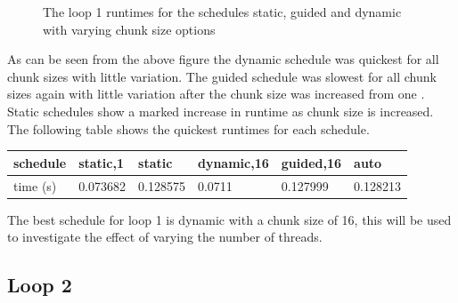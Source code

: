 \documentclass[12pt]{article} %
\begin{document}
\begin{figure}[H] %
\caption{The loop 1 runtimes for the schedules static, guided and dynamic with varying chunk size options}
\label{fig:speciation}
\end{figure}

As can be seen from the above figure the dynamic schedule was quickest for all chunk sizes with little variation. The guided schedule was slowest for all chunk sizes again with little variation after the chunk size was increased from one . Static schedules show a marked increase in runtime as chunk size is increased. The following table shows the quickest runtimes for each schedule. 

\begin{center}
    \begin{tabular}{| l | l | l | l | l | l |}
    \hline
    schedule &static,1 & static &dynamic,16 & guided,16 & auto \\ \hline
    time (s) &0.073682&0.128575 & 0.0711& 0.127999& 0.128213\\ \hline
    \end{tabular}
\end{center} 

The best schedule for loop 1 is dynamic with a chunk size of 16, this will be used to investigate the effect of varying the number of threads.

\subsection{Loop 2}
\end{document}
